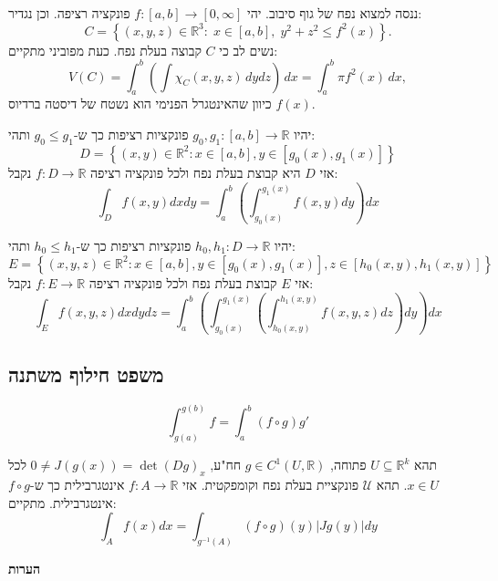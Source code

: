 \documentclass{tstextbook}
\begin{document}
\begin{example}
ננסה למצוא נפח של גוף סיבוב. יהי \(f:[a,b]\to\left[ 0,\infty \right]\) פונקציה רציפה. וכן נגדיר:
$$C=\left\{(x,y,z)\in\mathbb{R}^{3}:\;x\in[a,b],\;y^{2}+z^{2}\leq f^{2}(x)\right\}.$$
נשים לב כי \(C\) קבוצה בעלת נפח. כעת מפוביני מתקיים:
$$V(C)=\int_{a}^{b}\left(\int\chi_{C}(x,y,z)\,d y d z\right)\,d x=\int_{a}^{b}\pi f^{2}(x)\,d x,$$
כיוון שהאינטגרל הפנימי הוא נשטח של דיסטה ברדיוס \(f(x)\). 

\end{example}
\begin{corollary}
יהיו \(g_{0},g_{1}:[a,b]\to \mathbb{R}\) פונקציות רציפות כך ש-\(g_{0}\leq g_{1}\) ותהי:
$$D=\left\{\left(x,y\right)\in\mathbb{R}^{2}:x\in\left[a,b\right],y\in\left[g_{0}\left(x\right),g_{1}\left(x\right)\right]\right\}$$
אזי \(D\) היא קבוצת בעלת נפח ולכל פונקציה רציפה \(f:D\to\mathbb{R}\) נקבל:
$$\int_{D}f\left(x,y\right)d x d y=\int_{a}^{b}\left(\int_{g_{0}\left(x\right)}^{g_{1}\left(x\right)}f\left(x,y\right)d y\right)d x$$

\end{corollary}
\begin{corollary}
יהיו \(h_{0},h_{1}:D\to\mathbb{R}\) פונקציות רציפות כך ש-\(h_{0}\leq h_{1}\) ותהי:
$$E=\left\{\left(x,y,z\right)\in\mathbb{R}^{2}:x\in\left[a,b\right],y\in\left[g_{0}\left(x\right),g_{1}\left(x\right)\right],z\in\left[h_{0}\left(x,y\right),h_{1}\left(x,y\right)\right]\right\}$$
אזי \(E\) קבוצת בעלת נפח ולכל פונקציה רציפה \(f:E\to\mathbb{R}\) נקבל:
$$\int_{E}f\left(x,y,z\right)d x d y d z=\int_{a}^{b}\left(\int_{g_{0}\left(x\right)}^{g_{1}\left(x\right)}\left(\int_{h_{0}\left(x,y\right)}^{h_{1}\left(x,y\right)}f\left(x,y,z\right)d z\right)d y\right)d x$$

\end{corollary}
\subsection{משפט חילוף משתנה}

\begin{theorem}
$$\int_{g(a)}^{g(b)} f=\int_{a}^{b}\left( f\circ g \right)g'$$

\end{theorem}
\begin{theorem}
תהא \(U\subseteq \mathbb{R}^k\) פתוחה, \(g\in C^1\left( U,\mathbb{R} \right)\) חח"ע, \(0\neq J(g(x))=\det(Dg)_{x}\) לכל \(x \in U\).
תהא \(\mathcal{U}\) פונקציית בעלת נפח וקומפקטית. אזי \(f:A\to\mathbb{R}\) אינטגרבילית כך ש-\(f\circ g\) אינטגרבילית. מתקיים:
$$\int_{A} f(x)dx=\int_{g^{-1}(A)}\left( f\circ g \right)(y)|Jg(y)|dy$$

\end{theorem}
\textbf{הערות}
\end{document}
